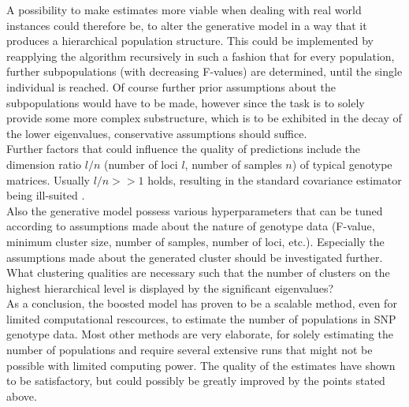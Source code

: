 \documentclass[a4paper, 11pt]{article}
\begin{document}
A possibility to make estimates more viable when dealing with real world instances could therefore be, to alter the generative model in a way that it produces a hierarchical population structure. This could be implemented by reapplying the algorithm recursively in such a fashion that for every population, further subpopulations (with decreasing F-values) are determined, until the single individual is reached. Of course further prior assumptions about the subpopulations would have to be made, however since the task is to solely provide some more complex substructure, which is to be exhibited in the decay of the lower eigenvalues, conservative assumptions should suffice.\\
Further factors that could influence the quality of predictions include the dimension ratio $l/n$ (number of loci $l$, number of samples $n$) of typical genotype matrices. Usually $l/n >> 1$ holds, resulting in the standard covariance estimator being ill-suited \parencite{ledoit2004well, schafer2005shrinkage}.\\
Also the generative model possess various hyperparameters that can be tuned according to assumptions made about the nature of genotype data (F-value, minimum cluster size, number of samples, number of loci, etc.). Especially the assumptions made about the generated cluster should be investigated further. What clustering qualities are necessary such that the number of clusters on the highest hierarchical level is displayed by the significant eigenvalues?\\
As a conclusion, the boosted model has proven to be a scalable method, even for limited computational rescources, to estimate the number of populations in SNP genotype data. Most other methods are very elaborate, for solely estimating the number of populations and require several extensive runs that might not be possible with limited computing power. The quality of the estimates have shown to be satisfactory, but could possibly be greatly improved by the points stated above.\\ 

\printbibliography
\end{document}
